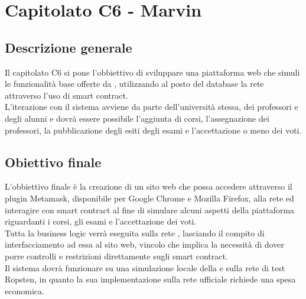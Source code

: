 \documentclass[StudioDiFattibilità.tex]{subfiles}
\begin{document}
\chapter{Capitolato C6 - Marvin}
\section{Descrizione generale}
Il capitolato C6 si pone l'obbiettivo di sviluppare una piattaforma web che simuli le funzionalità base offerte da , utilizzando al posto del database la rete  attraverso l'uso di smart contract.\\
L'iterazione con il sistema avviene da parte dell'università stessa, dei professori e degli alunni e dovrà essere possibile l'aggiunta di corsi, l'assegnazione dei professori, la pubblicazione degli esiti degli esami e l'accettazione o meno dei voti.
\section{Obiettivo finale}
L'obbiettivo finale è la creazione di un sito web che possa accedere attraverso il plugin Metamask, disponibile per Google Chrome e Mozilla Firefox, alla rete  ed interagire con smart contract al fine di simulare alcuni aspetti della piattaforma  riguardanti i corsi, gli esami e l'accettazione dei voti.\\
Tutta la business logic verrà eseguita sulla rete , lasciando il compito di interfacciamento ad essa al sito web, vincolo che implica la necessità di dover porre controlli e restrizioni direttamente sugli smart contract.\\
Il sistema dovrà funzionare su una simulazione locale della  e sulla rete di test Ropsten, in quanto la sua implementazione sulla rete ufficiale  richiede una spesa economica.
\end{document}
